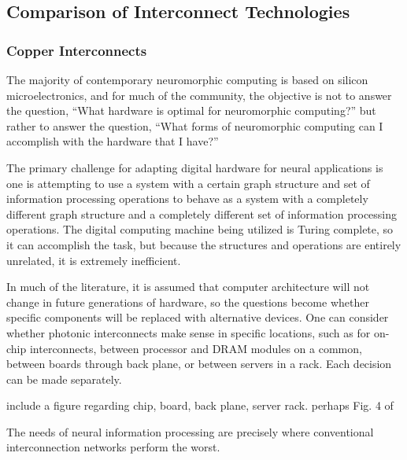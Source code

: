 \subsection{\label{sec:comparison_of_interconnects}Comparison of Interconnect Technologies}

\subsubsection{Copper Interconnects}
The majority of contemporary neuromorphic computing is based on silicon microelectronics, and for much of the community, the objective is not to answer the question, ``What hardware is optimal for neuromorphic computing?'' but rather to answer the question, ``What forms of neuromorphic computing can I accomplish with the hardware that I have?'' 

\vspace{3em}
The primary challenge for adapting digital hardware for neural applications is one is attempting to use a system with a certain graph structure and set of information processing operations to behave as a system with a completely different graph structure and a completely different set of information processing operations. The digital computing machine being utilized is Turing complete, so it can accomplish the task, but because the structures and operations are entirely unrelated, it is extremely inefficient.

\vspace{3em}
In much of the literature, it is assumed that computer architecture will not change in future generations of hardware, so the questions become whether specific components will be replaced with alternative devices. One can consider whether photonic interconnects make sense in specific locations, such as for on-chip interconnects, between processor and DRAM modules on a common, between boards through back plane, or between servers in a rack. Each decision can be made separately. 

\vspace{3em}
include a figure regarding chip, board, back plane, server rack. perhaps Fig. 4 of \cite{husz2003}

\vspace{3em}
The needs of neural information processing are precisely where conventional interconnection networks perform the worst.

